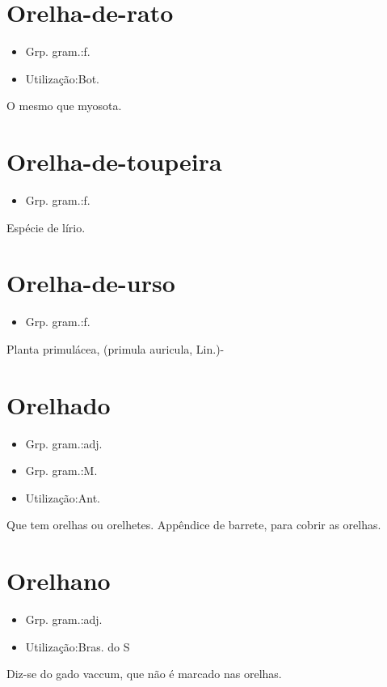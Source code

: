 \section{Orelha-de-rato}
\begin{itemize}
\item {Grp. gram.:f.}
\end{itemize}
\begin{itemize}
\item {Utilização:Bot.}
\end{itemize}
O mesmo que \textunderscore myosota\textunderscore .
\section{Orelha-de-toupeira}
\begin{itemize}
\item {Grp. gram.:f.}
\end{itemize}
Espécie de lírio.
\section{Orelha-de-urso}
\begin{itemize}
\item {Grp. gram.:f.}
\end{itemize}
Planta primulácea, (\textunderscore primula auricula\textunderscore , Lin.)-
\section{Orelhado}
\begin{itemize}
\item {Grp. gram.:adj.}
\end{itemize}
\begin{itemize}
\item {Grp. gram.:M.}
\end{itemize}
\begin{itemize}
\item {Utilização:Ant.}
\end{itemize}
Que tem orelhas ou orelhetes.
Appêndice de barrete, para cobrir as orelhas.
\section{Orelhano}
\begin{itemize}
\item {Grp. gram.:adj.}
\end{itemize}
\begin{itemize}
\item {Utilização:Bras. do S}
\end{itemize}
Diz-se do gado vaccum, que não é marcado nas orelhas.
